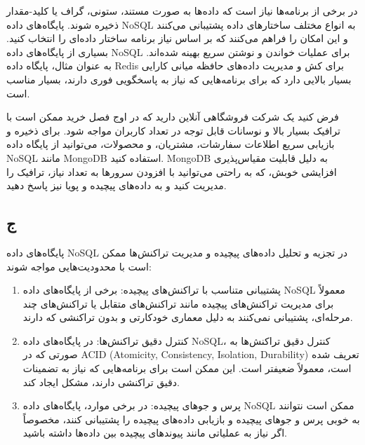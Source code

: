 در برخی از برنامه‌ها نیاز است که داده‌ها به صورت مستند، ستونی، گراف یا کلید-مقدار ذخیره شوند. پایگاه‌های داده NoSQL به انواع مختلف ساختارهای داده پشتیبانی می‌کنند و این امکان را فراهم می‌کنند که بر اساس نیاز برنامه ساختار داده‌ای را انتخاب کنید.
 بسیاری از پایگاه‌های داده NoSQL برای عملیات خواندن و نوشتن سریع بهینه شده‌اند. به عنوان مثال، پایگاه داده Redis برای کش و مدیریت داده‌های حافظه میانی کارایی بسیار بالایی دارد که برای برنامه‌هایی که نیاز به پاسخگویی فوری دارند، بسیار مناسب است.
 
فرض کنید یک شرکت فروشگاهی آنلاین دارید که در اوج فصل خرید ممکن است با ترافیک بسیار بالا و نوسانات قابل توجه در تعداد کاربران مواجه شود. برای ذخیره و بازیابی سریع اطلاعات سفارشات، مشتریان، و محصولات، می‌توانید از پایگاه داده NoSQL مانند MongoDB استفاده کنید. MongoDB به دلیل قابلیت مقیاس‌پذیری افزایشی خوبش، که به راحتی می‌توانید با افزودن سرورها به تعداد نیاز، ترافیک را مدیریت کنید و به داده‌های پیچیده و پویا نیز پاسخ دهید.

\subsection*{ج}
پایگاه‌های داده NoSQL در تجزیه و تحلیل داده‌های پیچیده و مدیریت تراکنش‌ها ممکن است با محدودیت‌هایی مواجه شوند:
\begin{enumerate}


	\item پشتیبانی متناسب با تراکنش‌های پیچیده: برخی از پایگاه‌های داده NoSQL معمولاً برای مدیریت تراکنش‌های پیچیده مانند تراکنش‌های متقابل یا تراکنش‌های چند مرحله‌ای، پشتیبانی نمی‌کنند به دلیل معماری خودکارتی و بدون تراکنشی که دارند.

\item کنترل دقیق تراکنش‌ها: در پایگاه‌های داده NoSQL، کنترل دقیق تراکنش‌ها به صورتی که در ACID (Atomicity, Consistency, Isolation, Durability) تعریف شده است، معمولاً ضعیفتر است. این ممکن است برای برنامه‌هایی که نیاز به تضمینات دقیق تراکنشی دارند، مشکل ایجاد کند.

\item پرس و جوهای پیچیده: در برخی موارد، پایگاه‌های داده NoSQL ممکن است نتوانند به خوبی پرس و جوهای پیچیده و بازیابی داده‌های پیچیده را پشتیبانی کنند، مخصوصاً اگر نیاز به عملیاتی مانند پیوندهای پیچیده بین داده‌ها داشته باشید.
\end{enumerate}


